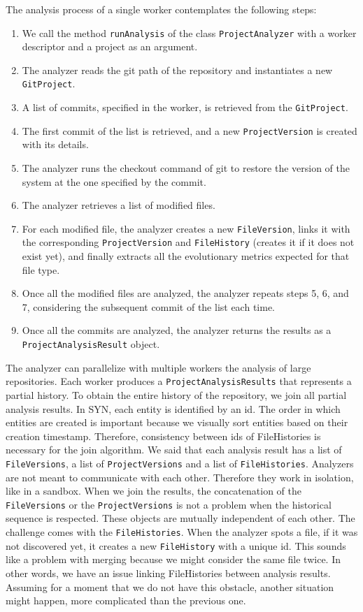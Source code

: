 The analysis process of a single worker contemplates the following steps:
\begin{enumerate}
    \item We call the method \texttt{runAnalysis} of the class \texttt{ProjectAnalyzer} with a worker descriptor and a project as an argument. 
    \item The analyzer reads the git path of the repository and instantiates a new \texttt{GitProject}. 
    \item A list of commits, specified in the worker, is retrieved from the \texttt{GitProject}.
    \item The first commit of the list is retrieved, and a new \texttt{ProjectVersion} is created with its details. 
    \item The analyzer runs the checkout command of git to restore the version of the system at the one specified by the commit. 
    \item The analyzer retrieves a list of modified files. 
    \item For each modified file, the analyzer creates a new \texttt{FileVersion}, links it with the corresponding  \texttt{ProjectVersion} and \texttt{FileHistory} (creates it if it does not exist yet), and finally extracts all the evolutionary metrics expected for that file type.
    \item Once all the modified files are analyzed, the analyzer repeats steps 5, 6, and 7, considering the subsequent commit of the list each time. 
    \item Once all the commits are analyzed, the analyzer returns the results as a \texttt{ProjectAnalysisResult} object. 
\end{enumerate}


The analyzer can parallelize with multiple workers the analysis of large repositories. Each worker produces a \texttt{Project\-AnalysisResults} that represents a partial history. To obtain the entire history of the repository, we join all partial analysis results. 
In SYN, each entity is identified by an id. 
The order in which entities are created is important because we visually sort entities based on their creation timestamp. 
Therefore, consistency between ids of FileHistories is necessary for the join algorithm.
We said that each analysis result has a list of \texttt{FileVersions}, a list of \texttt{ProjectVersions} and a list of \texttt{FileHistories}. 
Analyzers are not meant to communicate with each other. Therefore they work in isolation, like in a sandbox. 
When we join the results, the concatenation of the \texttt{FileVersions} or the \texttt{ProjectVersions} is not a problem when the historical sequence is respected. 
These objects are mutually independent of each other.
The challenge comes with the \texttt{FileHistories}. When the analyzer spots a file, if it was not discovered yet, it creates a new \texttt{FileHistory} with a unique id. 
This sounds like a problem with merging because we might consider the same file twice. In other words, we have an issue linking FileHistories between analysis results.
Assuming for a moment that we do not have this obstacle, another situation might happen, more complicated than the previous one.
 
